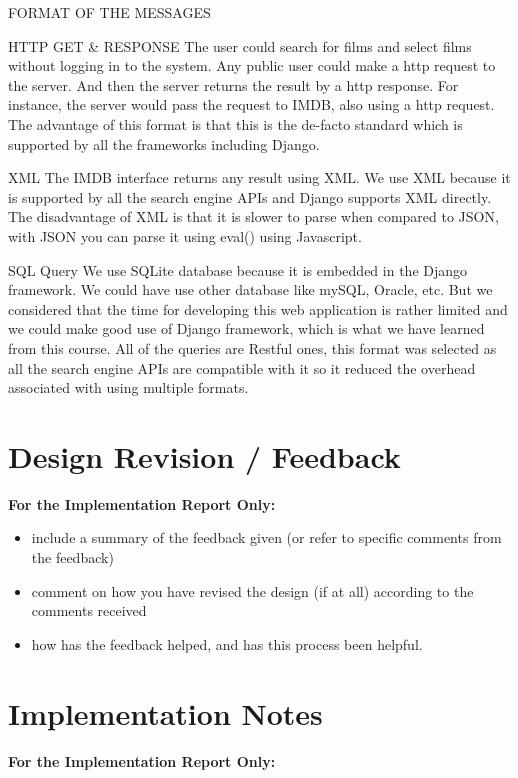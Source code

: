 \documentclass{sig-alt-release2}
\begin{document}
FORMAT OF THE MESSAGES 

HTTP GET \& RESPONSE
The user could search for films and select films without logging in to the system. Any public user could make a http request to the server. And then the server returns the result by a http response. For instance, the server would pass the request to IMDB, also using a http request. The advantage of this format is that this is the  de-facto standard which is supported by all the frameworks including Django. 

XML 
The IMDB interface returns any result using XML. We use XML because it is supported by all the search engine  APIs and Django supports XML directly. The disadvantage of XML is that it is slower to parse when compared to JSON, with JSON you can parse it using eval() using Javascript. 

SQL Query 
We use SQLite database because it is embedded in the Django framework. We could have use other database like mySQL, Oracle, etc. But we considered that the time for developing this web application is rather limited and we could make good use of Django framework, which is what we have learned from this course. All of the queries are Restful ones, this format was selected as all the search engine APIs are compatible with it so it reduced the overhead associated with using multiple formats.





\section{Design Revision / Feedback}
{\bf For the Implementation Report Only:}
\begin{itemize}
\item	include a summary of the feedback given (or refer to specific comments from the feedback) 
\item	comment on how you have revised the design (if at all) according to the comments received 
\item	how has the feedback helped, and has this process been helpful.
\end{itemize}

\section{Implementation Notes}
{\bf For the Implementation Report Only:}
\end{document}
